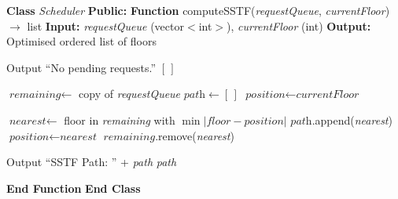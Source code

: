 \documentclass[a4paper,11pt]{article}
\begin{document}
\begin{algorithm}
\caption{Calculate Path -- SSTF (Shortest Seek Time First)}
\begin{algorithmic}[1]

\State \textbf{Class} \textit{Scheduler}
\State \hspace{0.5cm} \textbf{Public:}
\State \hspace{1cm} \textbf{Function} computeSSTF(\textit{requestQueue}, \textit{currentFloor}) $\rightarrow$ list
\State \hspace{1.5cm} \textbf{Input:} \textit{requestQueue} (vector$<$int$>$), \textit{currentFloor} (int)
\State \hspace{1.5cm} \textbf{Output:} Optimised ordered list of floors

    \State Output ``No pending requests.''
    \State \Return $[\,]$
\EndIf

\State $\textit{remaining} \leftarrow$ copy of \textit{requestQueue}
\State $\textit{path} \leftarrow [\,]$
\State $\textit{position} \leftarrow \textit{currentFloor}$

    \State $\textit{nearest} \leftarrow$ floor in \textit{remaining} with $\min|\textit{floor} - \textit{position}|$
    \State $\textit{path}$.append(\textit{nearest})
    \State $\textit{position} \leftarrow \textit{nearest}$
    \State $\textit{remaining}$.remove(\textit{nearest})
\EndWhile

\State Output ``SSTF Path: '' + \textit{path}
\State \Return \textit{path}

\State \hspace{1cm} \textbf{End Function}
\State \textbf{End Class}

\end{algorithmic}
\end{algorithm}
\end{document}
